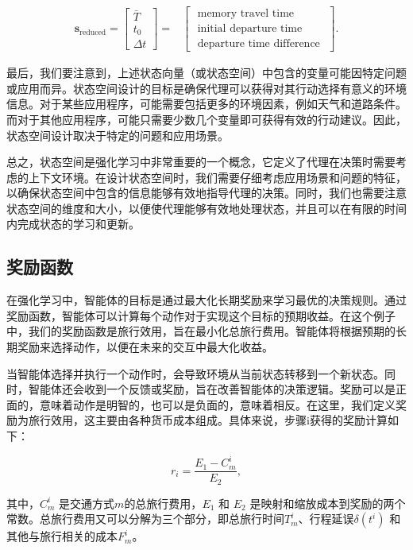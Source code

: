 \begin{equation}
\begin{aligned}
\bm{s}_\text{reduced}=\left[\begin{array}{c}
\bar{T} \\
t_{0} \\
\Delta t
\end{array}\right]=&\left[\begin{array}{c}
\text { memory travel time } \\
\text { initial departure time } \\
\text { departure time difference }
\end{array}\right].
\end{aligned}\label{equation:obs}
\end{equation}

最后，我们要注意到，上述状态向量（或状态空间）中包含的变量可能因特定问题或应用而异。状态空间设计的目标是确保代理可以获得对其行动选择有意义的环境信息。对于某些应用程序，可能需要包括更多的环境因素，例如天气和道路条件。而对于其他应用程序，可能只需要少数几个变量即可获得有效的行动建议。因此，状态空间设计取决于特定的问题和应用场景。

总之，状态空间是强化学习中非常重要的一个概念，它定义了代理在决策时需要考虑的上下文环境。在设计状态空间时，我们需要仔细考虑应用场景和问题的特征，以确保状态空间中包含的信息能够有效地指导代理的决策。同时，我们也需要注意状态空间的维度和大小，以便使代理能够有效地处理状态，并且可以在有限的时间内完成状态的学习和更新。
\subsection{奖励函数}
在强化学习中，智能体的目标是通过最大化长期奖励来学习最优的决策规则。通过奖励函数，智能体可以计算每个动作对于实现这个目标的预期收益。在这个例子中，我们的奖励函数是旅行效用，旨在最小化总旅行费用。智能体将根据预期的长期奖励来选择动作，以便在未来的交互中最大化收益。

当智能体选择并执行一个动作时，会导致环境从当前状态转移到一个新状态。同时，智能体还会收到一个反馈或奖励，旨在改善智能体的决策逻辑。奖励可以是正面的，意味着动作是明智的，也可以是负面的，意味着相反。在这里，我们定义奖励为旅行效用，这主要由各种货币成本组成。具体来说，步骤i获得的奖励计算如下：

\begin{equation}
r_{i}=\frac{E_{1}-C_{m}^{i}}{E_{2}},\label{reward function}
\end{equation}

其中，$C_m^i$ 是交通方式$m$的总旅行费用，$E_1$ 和 $E_2$ 是映射和缩放成本到奖励的两个常数。总旅行费用又可以分解为三个部分，即总旅行时间$T_m^i$、行程延误$\delta(t^i)$ 和其他与旅行相关的成本$F_m^i$。

